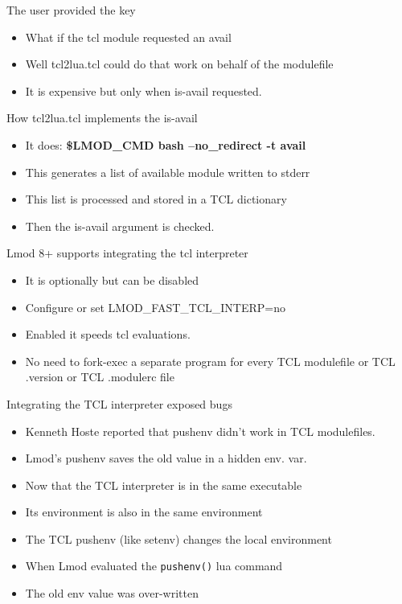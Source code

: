 \documentclass{beamer}
\begin{document}
\begin{frame}{The user provided the key}
  \begin{itemize}
    \item What if the tcl module requested an avail
    \item Well tcl2lua.tcl could do that work on behalf of the modulefile
    \item It is expensive but only when is-avail requested.
  \end{itemize}
\end{frame}

\begin{frame}{How tcl2lua.tcl implements the is-avail}
  \begin{itemize}
    \item It does: \textbf{\$LMOD\_CMD bash --no\_redirect -t avail}
    \item This generates a list of available module written to stderr
    \item This list is processed and stored in a TCL dictionary
    \item Then the is-avail argument is checked.
  \end{itemize}
\end{frame}

\begin{frame}{Lmod 8+ supports integrating the tcl interpreter}
  \begin{itemize}
    \item It is optionally but can be disabled
    \item Configure or set LMOD\_FAST\_TCL\_INTERP=no
    \item Enabled it speeds tcl evaluations.
    \item No need to fork-exec a separate program for every TCL
      modulefile or TCL .version or TCL .modulerc file
  \end{itemize}
\end{frame}

\begin{frame}{Integrating the TCL interpreter exposed bugs}
  \begin{itemize}
    \item Kenneth Hoste reported that pushenv didn't work in TCL
      modulefiles.
    \item Lmod's pushenv saves the old value in a hidden env. var.
    \item Now that the TCL interpreter is in the same executable
    \item Its environment is also in the same environment
    \item The TCL pushenv (like setenv) changes the local environment
    \item When Lmod evaluated the \texttt{pushenv()} lua command
    \item The old env value was over-written
  \end{itemize}
\end{frame}
\end{document}
